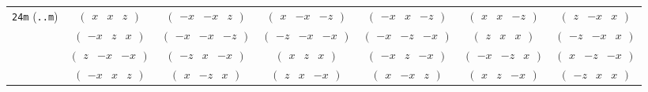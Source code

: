 \documentclass[fleqn,9pt,landscape]{jsarticle}
\begin{document}
\begin{center}
\begin{longtable}{ccccccc}
{\tt 24m} ({\tt ..m}) & $ \begin{pmatrix} x & x & z \end{pmatrix} $ & $ \begin{pmatrix} - x & - x & z \end{pmatrix} $ & $ \begin{pmatrix} x & - x & - z \end{pmatrix} $ & $ \begin{pmatrix} - x & x & - z \end{pmatrix} $ & $ \begin{pmatrix} x & x & - z \end{pmatrix} $ & $ \begin{pmatrix} z & - x & x \end{pmatrix} $ \\
& $ \begin{pmatrix} - x & z & x \end{pmatrix} $ & $ \begin{pmatrix} - x & - x & - z \end{pmatrix} $ & $ \begin{pmatrix} - z & - x & - x \end{pmatrix} $ & $ \begin{pmatrix} - x & - z & - x \end{pmatrix} $ & $ \begin{pmatrix} z & x & x \end{pmatrix} $ & $ \begin{pmatrix} - z & - x & x \end{pmatrix} $ \\
& $ \begin{pmatrix} z & - x & - x \end{pmatrix} $ & $ \begin{pmatrix} - z & x & - x \end{pmatrix} $ & $ \begin{pmatrix} x & z & x \end{pmatrix} $ & $ \begin{pmatrix} - x & z & - x \end{pmatrix} $ & $ \begin{pmatrix} - x & - z & x \end{pmatrix} $ & $ \begin{pmatrix} x & - z & - x \end{pmatrix} $ \\
& $ \begin{pmatrix} - x & x & z \end{pmatrix} $ & $ \begin{pmatrix} x & - z & x \end{pmatrix} $ & $ \begin{pmatrix} z & x & - x \end{pmatrix} $ & $ \begin{pmatrix} x & - x & z \end{pmatrix} $ & $ \begin{pmatrix} x & z & - x \end{pmatrix} $ & $ \begin{pmatrix} - z & x & x \end{pmatrix} $ \\ \hline

\end{longtable}
\end{center}
\end{document}
